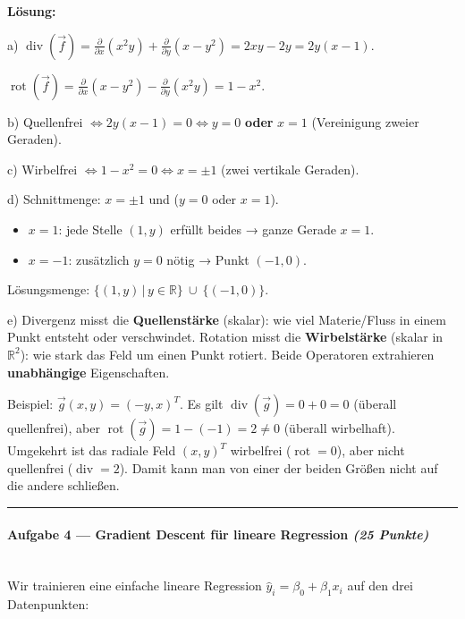 \documentclass[11pt, a4paper]{article}
\begin{document}
\textbf{Lösung:}


a) $\operatorname{div}(\vec{f}) = \frac{\partial}{\partial x}(x^2y) + \frac{\partial}{\partial y}(x-y^2) = 2xy - 2y = 2y(x-1)$.

$\operatorname{rot}(\vec{f}) = \frac{\partial}{\partial x}(x-y^2) - \frac{\partial}{\partial y}(x^2y) = 1 - x^2$.


b) Quellenfrei $\Leftrightarrow 2y(x-1) = 0 \Leftrightarrow y=0$ \textbf{oder} $x=1$ (Vereinigung zweier Geraden).


c) Wirbelfrei $\Leftrightarrow 1-x^2 = 0 \Leftrightarrow x = \pm 1$ (zwei vertikale Geraden).


d) Schnittmenge: $x=\pm 1$ und ($y=0$ oder $x=1$).

\begin{itemize}
  \item $x=1$: jede Stelle $(1,y)$ erfüllt beides → ganze Gerade $x=1$.
  \item $x=-1$: zusätzlich $y=0$ nötig → Punkt $(-1, 0)$.
\end{itemize}

Lösungsmenge: $\{(1,y)\,|\,y\in\mathbb{R}\}\ \cup\ \{(-1,0)\}$.


e) Divergenz misst die \textbf{Quellenstärke} (skalar): wie viel Materie/Fluss in einem Punkt entsteht oder verschwindet. Rotation misst die \textbf{Wirbelstärke} (skalar in $\mathbb{R}^2$): wie stark das Feld um einen Punkt rotiert. Beide Operatoren extrahieren \textbf{unabhängige} Eigenschaften.


Beispiel: $\vec{g}(x,y) = (-y, x)^T$. Es gilt $\operatorname{div}(\vec{g}) = 0 + 0 = 0$ (überall quellenfrei), aber $\operatorname{rot}(\vec{g}) = 1 - (-1) = 2 \neq 0$ (überall wirbelhaft). Umgekehrt ist das radiale Feld $(x,y)^T$ wirbelfrei ($\operatorname{rot}=0$), aber nicht quellenfrei ($\operatorname{div}=2$). Damit kann man von einer der beiden Größen nicht auf die andere schließen.



\noindent\textcolor{rulegray}{\rule{\linewidth}{0.4pt}}


\paragraph{Aufgabe 4 — Gradient Descent für lineare Regression \textit{(25 Punkte)}}\mbox{}\\[2pt]

Wir trainieren eine einfache lineare Regression $\hat{y}_i = \beta_0 + \beta_1 x_i$ auf den drei Datenpunkten:
\end{document}
